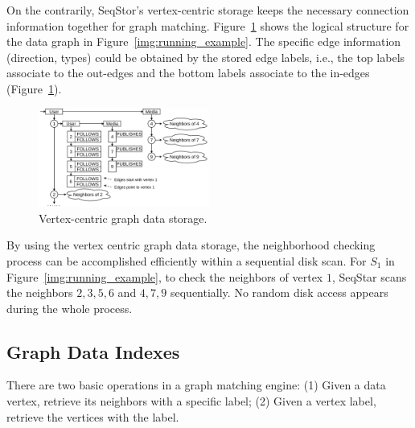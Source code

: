 On the contrarily, SeqStor's vertex-centric storage keeps the necessary connection information together for graph matching.
Figure~\ref{img:data_example} shows the logical structure for the data graph in Figure~\ref{img:running_example}.
The specific edge information (direction, types) could be obtained by the stored edge labels, i.e., the top labels associate to the out-edges and the bottom labels associate to the in-edges (Figure~\ref{img:data_example}).

\begin{figure}[ht]
  \centering
  \includegraphics[width=0.5\textwidth]{img/data_example.pdf}
  \caption{Vertex-centric graph data storage.}\label{img:data_example}
\end{figure}

By using the vertex centric graph data storage, the neighborhood checking process can be accomplished efficiently within a sequential disk scan.
For $S_1$ in Figure~\ref{img:running_example},
to check the neighbors of vertex $1$, SeqStar scans the neighbors $2, 3, 5, 6$ and $4, 7, 9$ sequentially.
No random disk access appears during the whole process.
\subsection{Graph Data Indexes}
There are two basic operations in a graph matching engine:
(1) Given a data vertex, retrieve its neighbors with a specific label;
(2) Given a vertex label, retrieve the vertices with the label.

